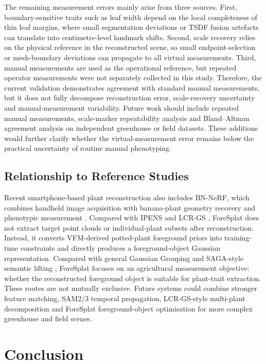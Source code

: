 \documentclass[a4paper]{cas-sc}
\begin{document}
The remaining measurement errors mainly arise from three sources. First, boundary-sensitive traits such as leaf width depend on the local completeness of thin leaf margins, where small segmentation deviations or TSDF fusion artefacts can translate into centimetre-level landmark shifts. Second, scale recovery relies on the physical reference in the reconstructed scene, so small endpoint-selection or mesh-boundary deviations can propagate to all virtual measurements. Third, manual measurements are used as the operational reference, but repeated operator measurements were not separately collected in this study. Therefore, the current validation demonstrates agreement with standard manual measurements, but it does not fully decompose reconstruction error, scale-recovery uncertainty and manual-measurement variability. Future work should include repeated manual measurements, scale-marker repeatability analysis and Bland--Altman agreement analysis on independent greenhouse or field datasets. These additions would further clarify whether the virtual-measurement error remains below the practical uncertainty of routine manual phenotyping.

\subsection{Relationship to Reference Studies}\label{sec:relationship-to-reference-studies}

Recent smartphone-based plant reconstruction also includes BN-NeRF, which combines handheld image acquisition with banana-plant geometry recovery and phenotypic measurement \cite{ref60}. Compared with IPENS \cite{ref35} and LCR-GS \cite{ref34}, ForeSplat does not extract target point clouds or individual-plant subsets after reconstruction. Instead, it converts VFM-derived potted-plant foreground priors into training-time constraints and directly produces a foreground-object Gaussian representation. Compared with general Gaussian Grouping \cite{ref36} and SAGA-style semantic lifting \cite{ref37}, ForeSplat focuses on an agricultural measurement objective: whether the reconstructed foreground object is suitable for plant-trait extraction. These routes are not mutually exclusive. Future systems could combine stronger feature matching, SAM2/3 temporal propagation, LCR-GS-style multi-plant decomposition and ForeSplat foreground-object optimisation for more complex greenhouse and field scenes.

\section{Conclusion}\label{sec:conclusion}
\end{document}
